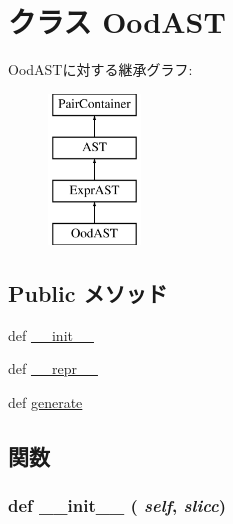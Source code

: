 \hypertarget{classslicc_1_1ast_1_1OodAST_1_1OodAST}{
\section{クラス OodAST}
\label{classslicc_1_1ast_1_1OodAST_1_1OodAST}
}
OodASTに対する継承グラフ:\begin{figure}[H]
\begin{center}
\leavevmode
\includegraphics[height=4cm]{classslicc_1_1ast_1_1OodAST_1_1OodAST}
\end{center}
\end{figure}
\subsection*{Public メソッド}
\begin{DoxyCompactItemize}
\item 
def \hyperlink{classslicc_1_1ast_1_1OodAST_1_1OodAST_ac775ee34451fdfa742b318538164070e}{\_\-\_\-init\_\-\_\-}
\item 
def \hyperlink{classslicc_1_1ast_1_1OodAST_1_1OodAST_ad8b9328939df072e4740cd9a63189744}{\_\-\_\-repr\_\-\_\-}
\item 
def \hyperlink{classslicc_1_1ast_1_1OodAST_1_1OodAST_a4555d1cee0dccf3942ea35fe86de2e8e}{generate}
\end{DoxyCompactItemize}


\subsection{関数}
\hypertarget{classslicc_1_1ast_1_1OodAST_1_1OodAST_ac775ee34451fdfa742b318538164070e}{
\subsubsection[{\_\-\_\-init\_\-\_\-}]{\setlength{\rightskip}{0pt plus 5cm}def \_\-\_\-init\_\-\_\- ( {\em self}, \/   {\em slicc})}}
\label{classslicc_1_1ast_1_1OodAST_1_1OodAST_ac775ee34451fdfa742b318538164070e}



